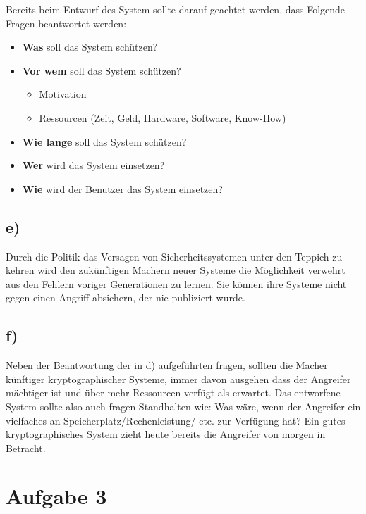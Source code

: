 \documentclass[10pt,a4paper]{article}
\begin{document}
Bereits beim Entwurf des System sollte darauf geachtet werden, dass Folgende Fragen beantwortet werden:

\begin{itemize}
\item \textbf{Was} soll das System schützen?
\item \textbf{Vor wem} soll das System schützen?
\begin{itemize}
\item Motivation
\item Ressourcen (Zeit, Geld, Hardware, Software, Know-How)
\end{itemize}
\item \textbf{Wie lange} soll das System schützen?
\item \textbf{Wer} wird das System einsetzen?
\item \textbf{Wie} wird der Benutzer das System einsetzen?
\end{itemize}

\subsection*{e)}
Durch die Politik das Versagen von Sicherheitssystemen unter den Teppich zu kehren wird den zukünftigen Machern neuer Systeme die Möglichkeit verwehrt aus den Fehlern voriger Generationen zu lernen. Sie können ihre Systeme nicht gegen
einen Angriff absichern, der nie publiziert wurde. 

\subsection*{f)}
Neben der Beantwortung der in d) aufgeführten fragen, sollten die Macher künftiger kryptographischer Systeme, immer davon ausgehen dass der Angreifer mächtiger ist und über mehr Ressourcen verfügt als erwartet. Das entworfene System sollte also auch fragen Standhalten wie:  Was wäre, wenn der Angreifer ein vielfaches an Speicherplatz/Rechenleistung/ etc. zur Verfügung hat?
Ein gutes kryptographisches System zieht heute bereits die Angreifer von morgen in Betracht.

\section*{Aufgabe 3}
\end{document}
